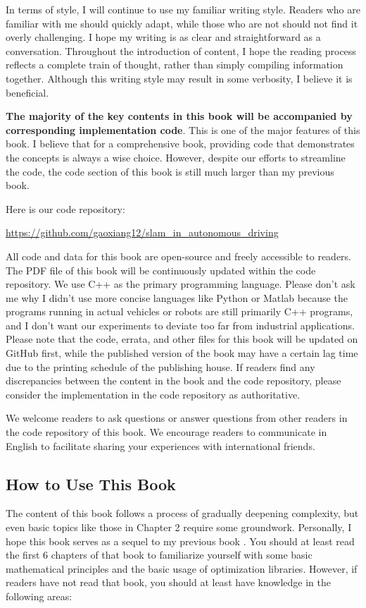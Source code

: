 In terms of style, I will continue to use my familiar writing style. Readers who are familiar with me should quickly adapt, while those who are not should not find it overly challenging. I hope my writing is as clear and straightforward as a conversation. Throughout the introduction of content, I hope the reading process reflects a complete train of thought, rather than simply compiling information together. Although this writing style may result in some verbosity, I believe it is beneficial.

\textbf{The majority of the key contents in this book will be accompanied by corresponding implementation code}. This is one of the major features of this book. I believe that for a comprehensive book, providing code that demonstrates the concepts is always a wise choice. However, despite our efforts to streamline the code, the code section of this book is still much larger than my previous book.

Here is our code repository:

\begin{mdframed}
	\centering \small
	\url{https://github.com/gaoxiang12/slam_in_autonomous_driving}
\end{mdframed}

All code and data for this book are open-source and freely accessible to readers. The PDF file of this book will be continuously updated within the code repository. We use C++ as the primary programming language. Please don't ask me why I didn't use more concise languages like Python or Matlab because the programs running in actual vehicles or robots are still primarily C++ programs, and I don't want our experiments to deviate too far from industrial applications. Please note that the code, errata, and other files for this book will be updated on GitHub first, while the published version of the book may have a certain lag time due to the printing schedule of the publishing house. If readers find any discrepancies between the content in the book and the code repository, please consider the implementation in the code repository as authoritative.

We welcome readers to ask questions or answer questions from other readers in the code repository of this book. We encourage readers to communicate in English to facilitate sharing your experiences with international friends.

\subsection*{How to Use This Book}
The content of this book follows a process of gradually deepening complexity, but even basic topics like those in Chapter 2 require some groundwork. Personally, I hope this book serves as a sequel to my previous book \cite{Gao2017}. You should at least read the first 6 chapters of that book to familiarize yourself with some basic mathematical principles and the basic usage of optimization libraries. However, if readers have not read that book, you should at least have knowledge in the following areas:

